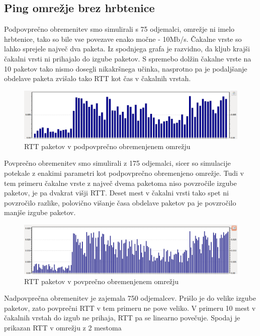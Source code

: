 \documentclass[a4paper,11pt]{article}
\begin{document}
\subsection{Ping omrežje brez hrbtenice}\par

Podpovprečno obremenitev smo simulirali s 75 odjemalci, omrežje ni imelo hrbtenice, tako so bile vse povezave enako močne - 10Mb/s. Čakalne vrste so lahko sprejele največ dva paketa. Iz spodnjega grafa je razvidno, da kljub krajši čakalni vrsti ni prihajalo do izgube paketov. S spremebo dolžin čakalne vrste na 10 paketov tako nismo dosegli nikakršnega učinka, nasprotno pa je podaljšanje obdelave paketa zvišalo tako RTT kot čas v čakalnih vrstah. 

\begin{figure}[h]
	\centering
	\includegraphics[width=\textwidth]{lRtt1.png}
	\caption{RTT paketov v podpovprečno obremenjenem omrežju}
	\label{RTT1}	
\end{figure}

Povprečno obremenitev smo simulirali z 175 odjemalci, sicer so simulacije potekale z enakimi parametri kot podpovprečno obremenjeno omrežje. Tudi v tem primeru čakalne vrste z največ dvema paketoma niso povzročile izgube paketov, je pa dvakrat višji RTT. Deset mest v čakalni vrsti tako spet ni povzročilo razlike, polovično višanje časa obdelave paketov pa je povzročilo manjše izgube paketov.

\begin{figure}[h]
	\centering
	\includegraphics[width=\textwidth]{aRtt1.png}
	\caption{RTT paketov v povprečno obremenjenem omrežju}
	\label{RTT2}	
\end{figure}

Nadpovprečna obremenitev je zajemala 750 odjemalcev. Prišlo je do velike izgube paketov, zato povprečni RTT v tem primeru ne pove veliko.  V primeru 10 mest v čakalnih vrstah do izgub ne prihaja, RTT pa se linearno povečuje. Spodaj je prikazan RTT v omrežju z 2 mestoma 
\end{document}
